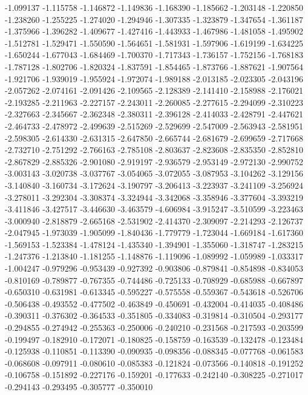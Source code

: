 -1.099137
-1.115758
-1.146872
-1.149836
-1.168390
-1.185662
-1.203148
-1.220850
-1.238260
-1.255225
-1.274020
-1.294946
-1.307335
-1.323879
-1.347654
-1.361187
-1.375966
-1.396282
-1.409677
-1.427416
-1.443933
-1.467986
-1.481058
-1.495902
-1.512781
-1.529471
-1.550590
-1.564651
-1.581931
-1.597906
-1.619199
-1.634225
-1.650244
-1.677043
-1.684469
-1.700370
-1.717343
-1.736157
-1.752156
-1.768183
-1.787128
-1.802706
-1.820324
-1.837591
-1.854465
-1.873766
-1.887621
-1.907564
-1.921706
-1.939019
-1.955924
-1.972074
-1.989188
-2.013185
-2.023305
-2.043196
-2.057262
-2.074161
-2.091426
-2.109565
-2.128389
-2.141410
-2.158988
-2.176021
-2.193285
-2.211963
-2.227157
-2.243011
-2.260085
-2.277615
-2.294099
-2.310223
-2.327663
-2.345667
-2.362348
-2.380311
-2.396128
-2.414033
-2.428791
-2.447621
-2.464733
-2.478972
-2.499639
-2.515269
-2.529699
-2.547009
-2.563943
-2.581951
-2.598305
-2.614330
-2.631315
-2.647850
-2.665744
-2.681679
-2.699659
-2.717668
-2.732710
-2.751292
-2.766163
-2.785108
-2.803637
-2.823608
-2.835350
-2.852810
-2.867829
-2.885326
-2.901080
-2.919197
-2.936579
-2.953149
-2.972130
-2.990752
-3.003143
-3.020738
-3.037767
-3.054065
-3.072055
-3.087953
-3.104262
-3.129156
-3.140840
-3.160734
-3.172624
-3.190797
-3.206413
-3.223937
-3.241109
-3.256924
-3.278011
-3.292304
-3.308374
-3.324944
-3.342068
-3.358946
-3.377604
-3.393219
-3.411846
-3.427517
-3.446630
-3.463579
-4.606984
-3.915247
-3.510599
-3.223463
-3.000940
-2.818879
-2.665168
-2.531902
-2.414370
-2.309097
-2.214293
-2.126737
-2.047945
-1.973039
-1.905099
-1.840436
-1.779779
-1.723044
-1.669184
-1.617360
-1.569153
-1.523384
-1.478124
-1.435340
-1.394901
-1.355060
-1.318747
-1.283215
-1.247376
-1.213840
-1.181255
-1.148876
-1.119096
-1.089992
-1.059989
-1.033317
-1.004247
-0.979296
-0.953439
-0.927392
-0.903806
-0.879841
-0.854898
-0.834053
-0.810169
-0.789877
-0.767355
-0.744486
-0.725133
-0.708929
-0.685988
-0.667897
-0.650310
-0.631981
-0.613345
-0.595227
-0.575558
-0.559367
-0.543618
-0.526706
-0.506438
-0.493552
-0.477502
-0.463849
-0.450691
-0.432004
-0.414035
-0.408486
-0.390311
-0.376302
-0.364533
-0.351805
-0.334083
-0.319814
-0.310504
-0.293177
-0.294855
-0.274942
-0.255363
-0.250006
-0.240210
-0.231568
-0.217593
-0.203599
-0.199497
-0.182910
-0.172071
-0.180825
-0.158759
-0.163539
-0.132478
-0.123484
-0.125938
-0.110851
-0.113390
-0.090935
-0.098356
-0.088345
-0.077768
-0.061583
-0.068608
-0.097911
-0.080610
-0.085383
-0.121824
-0.073566
-0.140818
-0.191252
-0.106758
-0.151892
-0.227176
-0.159201
-0.177633
-0.242140
-0.308225
-0.271017
-0.294143
-0.293495
-0.305777
-0.350010
